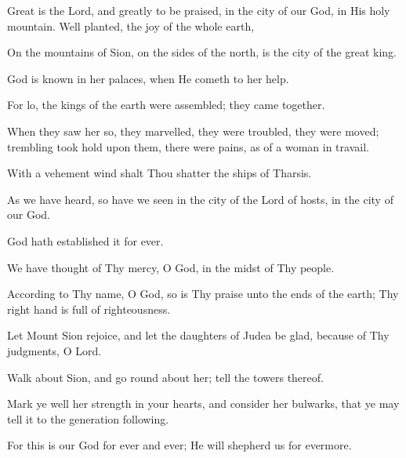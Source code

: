 Great is the Lord, and greatly to be praised, in the city of our God, in His holy mountain. Well planted, the joy of the whole earth,

On the mountains of Sion, on the sides of the north, is the city of the great king.

God is known in her palaces, when He cometh to her help.

For lo, the kings of the earth were assembled; they came together.

When they saw her so, they marvelled, they were troubled, they were moved; trembling took hold upon them, there were pains, as of a woman in travail.

With a vehement wind shalt Thou shatter the ships of Tharsis.

As we have heard, so have we seen in the city of the Lord of hosts, in the city of our God.

God hath established it for ever.

We have thought of Thy mercy, O God, in the midst of Thy people.

According to Thy name, O God, so is Thy praise unto the ends of the earth; Thy right hand is full of righteousness.

Let Mount Sion rejoice, and let the daughters of Judea be glad, because of Thy judgments, O Lord.

Walk about Sion, and go round about her; tell the towers thereof.

Mark ye well her strength in your hearts, and consider her bulwarks, that ye may tell it to the generation following.

For this is our God for ever and ever; He will shepherd us for evermore.
